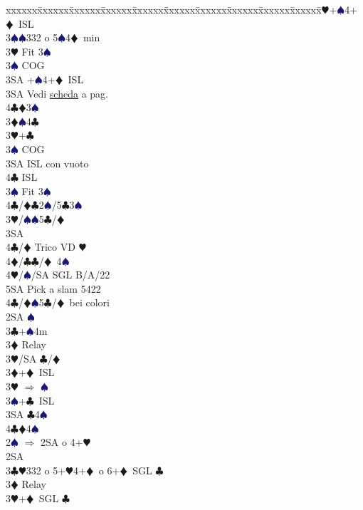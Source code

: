 \documentclass[a4paper,italian]{article}
\newcommand{\BC}{\textcolor{OliveGreen}{$\clubsuit$}}
\newcommand{\BD}{\textcolor{RedOrange}{$\vardiamondsuit$}}
\newcommand{\BH}{\textcolor{Red2}{$\varheartsuit${}}}
\newcommand{\BS}{\textcolor{MidnightBlue}{$\spadesuit${}}}
\newenvironment{bidtable}
{\begin{tabbing}

    xxxxxx\=xxxxxx\=xxxxxx\=xxxxxx\=xxxxxx\=xxxxxx\=xxxxxx\=xxxxxx\=xxxxxx\=xxxxxx\=\kill}
{\end{tabbing} }%
\begin{document}
\begin{multicols}{2}
\begin{bidtable}
        3\BH {}+\BS 4+\BD\ ISL\\
        3\BS {}\BS 332 o 5\BS 4\BD\ min\-\\
        3\BH \> Fit 3\BS \+\\
        3\BS \> COG\\
        3SA +\BS 4+\BD\ ISL\-\\
        3SA\> Vedi \hyperref[Riapertura3SA]{scheda} a pag. \pageref{Riapertura3SA}\\
        4\BC {}\BD 3\BS \-\\
        3\BD {}\BS 4\BC \+\\
        3\BH {}+\BC \+\\
        3\BS \> COG\\
        3SA \> ISL con vuoto\\
        4\BC \> ISL\-\\
        3\BS \> Fit 3\BS\\
        4\BC/\BD{}\BC2\BS/5\BC3\BS\-\\
        3\BH/\BS {}\BS 5\BC /\BD \+\\
        3SA\+\\
        4\BC/\BD \> Trico VD \BH \\
        4\BD/\BC {}\BC /\BD\ 4\BS \\
        4\BH/\BS/SA \>\> SGL B/A/22\\
        5SA \> Pick a slam 5422\-\-\\
        4\BC/\BD {}\BS 5\BC /\BD\ bei colori\-\\
        2SA \BS \+\\
        3\BC {}+\BS 4m\+\\
        3\BD \> Relay\+\\
        3\BH/SA \BC /\BD \-\-\\
        3\BD {}+\BD\ ISL\\
        3\BH \> $\Rightarrow$ \BS\\
        3\BS {}+\BC\ ISL\\
        3SA \BC 4\BS \\
        4\BC {}\BD 4\BS \-\-\\
        2\BS \> $\Rightarrow$ 2SA o 4+\BH \+\\
        2SA\+\\
        3\BC {}\BH 332 o 5+\BH 4+\BD\ o 6+\BD\ SGL \BC \+\\
        3\BD \> Relay\+\\
        3\BH {}+\BD\ SGL \BC \\

\end{bidtable}
\end{multicols}
\end{document}
